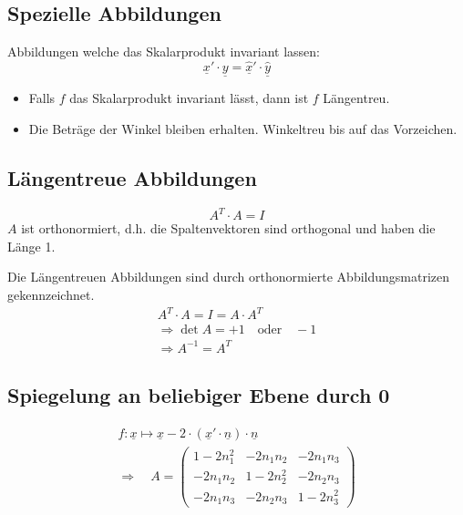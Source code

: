 \subsection{Spezielle Abbildungen}
Abbildungen welche das Skalarprodukt invariant lassen:
\begin{equation}
  \underline{x}' \cdot \underline{y} = \underline{\hat{x}}' \cdot \underline{\hat{y}}
\end{equation}
\begin{itemize}
  \item Falls $f$ das Skalarprodukt invariant l\"asst, dann ist $f$ L\"angentreu.
  \item Die Betr\"age der Winkel bleiben erhalten. Winkeltreu bis auf das Vorzeichen.
\end{itemize}


\subsection{L\"angentreue Abbildungen}
\begin{equation}
  A^T\cdot A = I
\end{equation}
$A$ ist orthonormiert, d.h. die Spaltenvektoren sind orthogonal und haben die L\"ange 1.

Die L\"angentreuen Abbildungen sind durch orthonormierte Abbildungsmatrizen gekennzeichnet.
\begin{gather}
  A^T\cdot A = I = A\cdot A^T \\
  \Longrightarrow \det{A} = +1 \quad\text{oder}\quad -1 \\
  \Longrightarrow A^{-1} = A^T
\end{gather}



\subsection{Spiegelung an beliebiger Ebene durch 0}
\begin{gather}
  f: \underline{x}\longmapsto\underline{x}-2\cdot (\underline{x}' \cdot\underline{n})\cdot\underline{n} \\
  \Longrightarrow \quad A = \begin{pmatrix}
		1-2n_1^2 & -2n_1n_2 & -2n_1n_3 \\
		-2n_1n_2 & 1-2n_2^2 & -2n_2n_3 \\
		-2n_1n_3 & -2n_2n_3 & 1-2n_3^2
	\end{pmatrix}
\end{gather}


